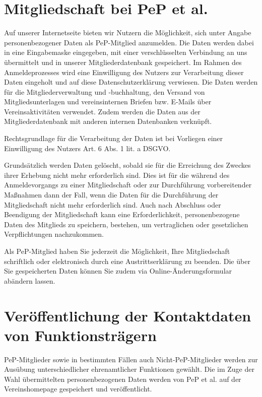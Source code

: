 \documentclass[
  fontsize=12pt,
  paper=a4,
  DIV14,
  parskip,
]{scrartcl}
\begin{document}
\section{Mitgliedschaft bei PeP et al.}

Auf unserer Internetseite bieten wir Nutzern die Möglichkeit, sich unter
Angabe personenbezogener Daten als PeP-Mitglied anzumelden.
Die Daten werden dabei in eine Eingabemaske eingegeben, mit einer
verschlüsselten Verbindung an uns übermittelt und in unserer
Mitgliederdatenbank gespeichert.
Im Rahmen des Anmeldeprozesses wird eine Einwilligung des Nutzers zur
Verarbeitung dieser Daten eingeholt und auf diese Datenschutzerklärung
verwiesen.
Die Daten werden für die Mitgliederverwaltung und -buchhaltung, den Versand
von Mitgliedsunterlagen und vereinsinternen Briefen bzw. E-Mails über
Vereinsaktivitäten verwendet.
Zudem werden die Daten aus der Mitgliederdatenbank mit anderen internen
Datenbanken verknüpft.

Rechtsgrundlage für die Verarbeitung der Daten ist bei Vorliegen einer
Einwilligung des Nutzers Art. 6 Abs. 1 lit. a DSGVO.

Grundsätzlich werden Daten gelöscht, sobald sie für die Erreichung des
Zweckes ihrer Erhebung nicht mehr erforderlich sind.
Dies ist für die während des Anmeldevorgangs zu einer Mitgliedschaft oder zur
Durchführung vorbereitender Maßnahmen dann der Fall, wenn die Daten für die
Durchführung der Mitgliedschaft nicht mehr erforderlich sind.
Auch nach Abschluss oder Beendigung der Mitgliedschaft kann eine
Erforderlichkeit, personenbezogene Daten des Mitglieds zu speichern,
bestehen, um vertraglichen oder gesetzlichen Verpflichtungen nachzukommen.

Als PeP-Mitglied haben Sie jederzeit die Möglichkeit, Ihre Mitgliedschaft
schriftlich oder elektronisch durch eine Austrittserklärung zu beenden.
Die über Sie gespeicherten Daten können Sie zudem via
Online-Änderungsformular abändern lassen.

\section{Veröffentlichung der Kontaktdaten von Funktionsträgern}

PeP-Mitglieder sowie in bestimmten Fällen auch Nicht-PeP-Mitglieder werden
zur Ausübung unterschiedlicher ehrenamtlicher Funktionen gewählt.
Die im Zuge der Wahl übermittelten personenbezogenen Daten werden von PeP et
al. auf der Vereinshomepage gespeichert und veröffentlicht.
\end{document}
